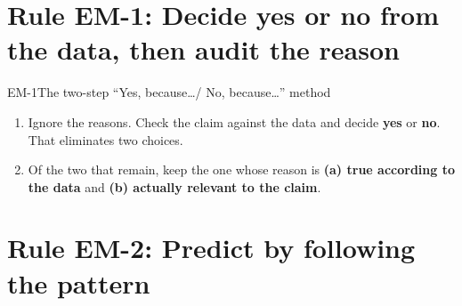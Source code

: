 \documentclass[11pt]{article}
\begin{document}
\maketitleblock

\begin{abstract}
Evaluation of Models, Inferences \& Experimental Results (EMI) covers about 9--14 questions and contains most of the section's hardest items. Interpretation of Data asks what the data say; EMI asks what they \emph{mean}: whether a hypothesis is supported, what a model predicts for a new case, where two scientists agree or disagree, which new finding would strengthen or weaken a claim, and how far a conclusion can reach. Most of these questions come from the Conflicting Viewpoints passage, but research-summary passages contribute ``Does this support\ldots?'' and ``predict\ldots'' items as well. This guide gives six rules, each tied to one of these question types, and drills them on four original passages, including two conflicting-viewpoints sets.
\end{abstract}

\scoringline

\tableofcontents
\clearpage

\section{Rule EM-1: Decide yes or no from the data, then audit the reason}

\begin{rulebox}{EM-1}{The two-step ``Yes, because\ldots / No, because\ldots'' method}
\begin{enumerate}
\item Ignore the reasons. Check the claim against the data and decide \textbf{yes} or \textbf{no}. That eliminates two choices.
\item Of the two that remain, keep the one whose reason is \textbf{(a) true according to the data} and \textbf{(b) actually relevant to the claim}.
\end{enumerate}
\end{rulebox}


\section{Rule EM-2: Predict by following the pattern}
\end{document}

